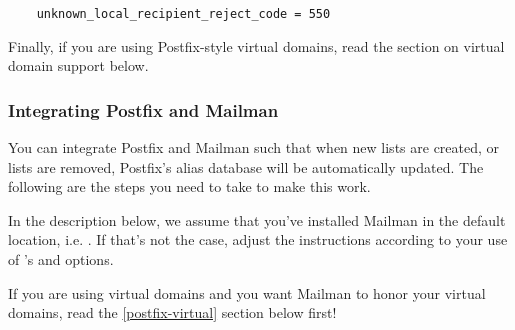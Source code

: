 \documentclass{howto}
\begin{document}
\begin{verbatim}
    unknown_local_recipient_reject_code = 550
\end{verbatim}

Finally, if you are using Postfix-style virtual domains, read the section on
virtual domain support below.

\subsubsection{Integrating Postfix and Mailman}

You can integrate Postfix and Mailman such that when new lists are created, or
lists are removed, Postfix's alias database will be automatically updated.
The following are the steps you need to take to make this work.

In the description below, we assume that you've installed Mailman in the
default location, i.e. .  If that's not the case,
adjust the instructions according to your use of 's
 and  options.

\begin{notice}[note]
If you are using virtual domains and you want Mailman to honor your virtual
domains, read the \ref{postfix-virtual} section below first!
\end{notice}
\end{document}
